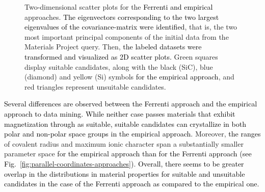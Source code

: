\documentclass[superscriptaddress,unsortedaddress,
 amsmath,amssymb,
 aps,
]{revtex4-2}
\newcommand{\mrk}[1]{\textcolor{black}{#1}}
\begin{document}
\begin{figure}
\begin{subfigure}{0.35\textwidth}
    \end{subfigure}
    \caption{Two-dimensional scatter plots for the \mrk{Ferrenti and empirical} approaches. \mrk{The eigenvectors corresponding to the two largest eigenvalues of the covariance-matrix were identified}, that is, the two most important principal components of the initial data from the Materials Project query. Then, \mrk{the labeled datasets were transformed and visualized as 2D scatter plots.} Green squares display suitable candidates, along with the black (SiC), blue (diamond) and yellow (Si) symbols \mrk{for the empirical approach}, and red triangles represent unsuitable candidates.}
    \label{fig:2dscatterplotpca}
\end{figure}


\mrk{Several differences are observed between the Ferrenti approach and the empirical approach to data mining. While neither case passes materials that exhibit magnetization through as suitable, suitable candidates can crystallize in both polar and non-polar space groups in the empirical approach.} Moreover, \mrk{the ranges}  of covalent radius and maximum ionic character span a substantially smaller parameter space \mrk{for the empirical approach than for the Ferrenti approach (see Fig.~\ref{fig:parallel-coordinates-approaches})}.
\mrk{Overall, there seems to be greater overlap in the distributions in material properties for suitable and unsuitable candidates in the case of the Ferrenti approach as compared to the empirical one.} 
\end{document}
